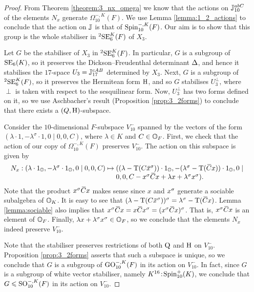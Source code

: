 \begin{proof}
	From Theorem \ref{theorem:3_nx_omega} we know that the actions on $\mathbb{J}_{10}^{abC}$
	of the elements $N_x$ generate $\Omega_{10}^{-,K}(F)$. We use 
	Lemma \ref{lemma:1_2_actions} to conclude that the action on $\mathbb{J}$ is that of
	$\mathrm{Spin}_{10}^{-,K}(F)$. Our aim is to show that this group is the whole stabiliser
	in ${}^2\mathrm{SE}_6^K(F)$ of $X_3$.
	
	Let $G$ be the stabiliser of $X_3$ in ${}^2\mathrm{SE}_6^K(F)$. In particular, $G$ is 
	a subgroup of $\mathrm{SE}_6(K)$, so it preserves the Dickson--Freudenthal determinant
	$\Delta$, and hence it stabilises the \mbox{$17$-space} $U_3 = \mathbb{J}_{17}^{cAB}$ 
	determined by $X_3$. Next, $G$
	is a subgroup of ${}^2\mathrm{SE}_6^K(F)$, so it preserves the Hermitean form $\mathrm{H}$,
	and so $G$ stabilises $U_3^{\perp}$, where $\perp$ is taken with respect to the
	sesquilinear form. 
	Now, $U_3^{\perp}$ has two forms defined on it, so we use Aschbacher's result 
	(Proposition \ref{prop:3_2forms}) to conclude that there exists a $(Q, \mathrm{H})$-subspace.	
	
	Consider the $10$-dimensional $F$-subspace $V_{10}^-$ spanned by the vectors 
	of the form $(\lambda\cdot 1, -\lambda^{\sigma}\cdot 1, 
	0 \mid 0,0,C)$, where $\lambda \in K$ and 
	$C \in \mathbb{O}_F$. First, we check that the action of our copy of $\Omega_{10}^{-,K}(F)$ 
	preserves $V_{10}^-$. The action on this subspace is given by
	\begin{equation*}
		\begin{array}{r@{\;}c@{\;}l}
			N_x: (\lambda\cdot 1_{\O}, -\lambda^{\sigma} \cdot 1_{\O}, 0 \mid 0,0, C) & \mapsto & 
				((\lambda - \Tr(C \ovx^{\s}))\cdot 1_{\O}, 
				-(\lambda^{\sigma} -\Tr(\ovC x))\cdot 1_{\O}, 
				0 \mid \\
		& &					0,0, C - x^{\s} \ovC x + \lambda x + \lambda^{\sigma} x^{\s}).
		\end{array}
	\end{equation*}
	Note that the product $x^{\sigma} \mathord{\mbox{\hspace*{0pt}}\,\overline{\!C\!\!\;}\!\:}\mbox{\hspace*{0pt}} x$ makes sense since $x$ and $x^{\sigma}$ generate a
	sociable subalgebra of $\mathbb{O}_K$. It is easy to see that 
	$(\lambda - \Tr(C\ovx^{\s}))^{\sigma} = 
	\lambda^{\sigma} - \Tr(\ovC x)$. Lemma \ref{lemma:sociable} also implies that 
	$x^{\s} \ovC x = x \ovC x^{\s} = (x^{\s} \ovC x)^{\s}$. That is, $x^{\sigma} \mathord{\mbox{\hspace*{0pt}}\,\overline{\!C\!\!\;}\!\:}\mbox{\hspace*{0pt}} x$ is an 
    element of $\mathbb{O}_F$. Finally, $\lambda x +  \lambda^{\sigma} x^{\sigma} \in \mathbb{O}_F$, 
    so we conclude that 
    the elements $N_x$ indeed preserve $V_{10}^{-}$.
    
	Note that the stabiliser preserves restrictions of both $\mathord{\mathrm{Q}}$ and $\mathrm{H}$ on $V_{10}^-$. Proposition
	\ref{prop:3_2forms} asserts that such a subspace is unique, so we conclude that $G$ is 
	a subgroup of $\mathrm{GO}_{10}^{-,K}(F)$ in its action on $V_{10}^-$. In fact, since $G$ is a 
	subgroup of white vector stabiliser, namely $K^{16}\mathord{{\;\!{:}\;\!}}\mathrm{Spin}_{10}^+(K)$, we conclude that 
	$G \leqslant \mathrm{SO}_{10}^{-,K}(F)$ in its action on $V_{10}^-$. 
	

\end{proof}
